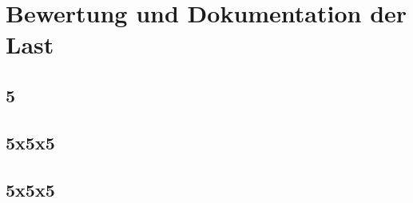 \section{Bewertung und Dokumentation der Last}

\subsection{5}

\subsection{5x5x5}

\subsection{5x5x5}

\clearpage